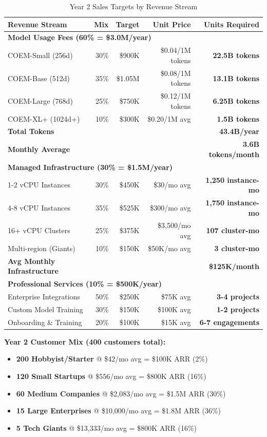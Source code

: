 \begin{table}[ht]
\centering
\small
\begin{tabular}{|l|r|r|r|r|}
\hline
\textbf{Revenue Stream} & \textbf{Mix} & \textbf{Target} & \textbf{Unit Price} & \textbf{Units Required} \\
\hline
\multicolumn{5}{|l|}{\textbf{Model Usage Fees (60\% = \$3.0M/year)}} \\
\hline
COEM-Small (256d) & 30\% & \$900K & \$0.04/1M tokens & \textbf{22.5B tokens} \\
COEM-Base (512d) & 35\% & \$1.05M & \$0.08/1M tokens & \textbf{13.1B tokens} \\
COEM-Large (768d) & 25\% & \$750K & \$0.12/1M tokens & \textbf{6.25B tokens} \\
COEM-XL+ (1024d+) & 10\% & \$300K & \$0.20/1M avg & \textbf{1.5B tokens} \\
\hline
\textbf{Total Tokens} & & & & \textbf{43.4B/year} \\
\textbf{Monthly Average} & & & & \textbf{3.6B tokens/month} \\
\hline
\multicolumn{5}{|l|}{\textbf{Managed Infrastructure (30\% = \$1.5M/year)}} \\
\hline
1-2 vCPU Instances & 30\% & \$450K & \$30/mo avg & \textbf{1,250 instance-mo} \\
4-8 vCPU Instances & 35\% & \$525K & \$300/mo avg & \textbf{1,750 instance-mo} \\
16+ vCPU Clusters & 25\% & \$375K & \$3,500/mo avg & \textbf{107 cluster-mo} \\
Multi-region (Giants) & 10\% & \$150K & \$50K/mo avg & \textbf{3 cluster-mo} \\
\hline
\textbf{Avg Monthly Infrastructure} & & & & \textbf{\$125K/month} \\
\hline
\multicolumn{5}{|l|}{\textbf{Professional Services (10\% = \$500K/year)}} \\
\hline
Enterprise Integrations & 50\% & \$250K & \$75K avg & \textbf{3-4 projects} \\
Custom Model Training & 30\% & \$150K & \$100K avg & \textbf{1-2 projects} \\
Onboarding \& Training & 20\% & \$100K & \$15K avg & \textbf{6-7 engagements} \\
\hline
\end{tabular}
\caption{Year 2 Sales Targets by Revenue Stream}
\end{table}

\textbf{Year 2 Customer Mix (400 customers total):}
\begin{itemize}[noitemsep]
    \item \textbf{200 Hobbyist/Starter} @ \$42/mo avg = \$100K ARR (2\%)
    \item \textbf{120 Small Startups} @ \$556/mo avg = \$800K ARR (16\%)
    \item \textbf{60 Medium Companies} @ \$2,083/mo avg = \$1.5M ARR (30\%)
    \item \textbf{15 Large Enterprises} @ \$10,000/mo avg = \$1.8M ARR (36\%)
    \item \textbf{5 Tech Giants} @ \$13,333/mo avg = \$800K ARR (16\%)
\end{itemize}

